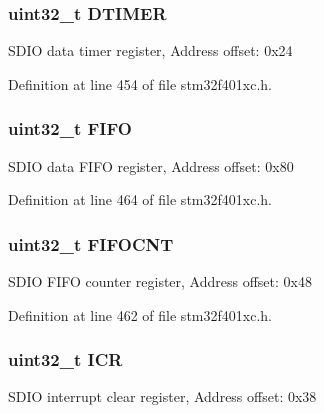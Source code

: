 \subsubsection[{\texorpdfstring{D\+T\+I\+M\+ER}{DTIMER}}]{ uint32\+\_\+t D\+T\+I\+M\+ER}\hypertarget{struct_s_d_i_o___type_def_a1dd219eaeee8d9def822da843028bd02}{}\label{struct_s_d_i_o___type_def_a1dd219eaeee8d9def822da843028bd02}
S\+D\+IO data timer register, Address offset\+: 0x24 

Definition at line 454 of file stm32f401xc.\+h.

\subsubsection[{\texorpdfstring{F\+I\+FO}{FIFO}}]{ uint32\+\_\+t F\+I\+FO}\hypertarget{struct_s_d_i_o___type_def_a68bef1da5fd164cf0f884b4209670dc8}{}\label{struct_s_d_i_o___type_def_a68bef1da5fd164cf0f884b4209670dc8}
S\+D\+IO data F\+I\+FO register, Address offset\+: 0x80 

Definition at line 464 of file stm32f401xc.\+h.

\subsubsection[{\texorpdfstring{F\+I\+F\+O\+C\+NT}{FIFOCNT}}]{ uint32\+\_\+t F\+I\+F\+O\+C\+NT}\hypertarget{struct_s_d_i_o___type_def_ab27b78e19f487c845437c29812eecca7}{}\label{struct_s_d_i_o___type_def_ab27b78e19f487c845437c29812eecca7}
S\+D\+IO F\+I\+FO counter register, Address offset\+: 0x48 

Definition at line 462 of file stm32f401xc.\+h.

\subsubsection[{\texorpdfstring{I\+CR}{ICR}}]{ uint32\+\_\+t I\+CR}\hypertarget{struct_s_d_i_o___type_def_a0a8c8230846fd8ff154b9fde8dfa0399}{}\label{struct_s_d_i_o___type_def_a0a8c8230846fd8ff154b9fde8dfa0399}
S\+D\+IO interrupt clear register, Address offset\+: 0x38 

